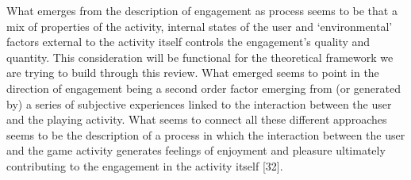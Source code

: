 What emerges from the description of engagement as process seems to be that a mix of properties of the activity, internal states of the user and ‘environmental’ factors external to the activity itself controls the engagement’s quality and quantity. This consideration will be functional for the theoretical framework we are trying to build through this review. What emerged seems to point in the direction of engagement being a second order factor emerging from (or generated by) a series of subjective experiences linked to the interaction between the user and the playing activity. What seems to connect all these different approaches seems to be the description of a process in which the interaction between the user and the game activity generates feelings of enjoyment and pleasure ultimately contributing to the engagement in the activity itself [32].

